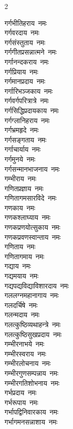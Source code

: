 \begin{multicols}{2}
\begin{flushleft}
गर्गभीतिहराय~नमः\hfill{}\\
गर्गवरदाय~नमः\\
गर्गसंस्तुताय~नमः\\
गर्गगीतप्रसन्नात्मने~नमः\\
गर्गानन्दकराय~नमः\\
गर्गप्रियाय~नमः\\
गर्गमानप्रदाय~नमः\\
गर्गारिभञ्जकाय~नमः\\
गर्गवर्गपरित्रात्रे~नमः\\
गर्गसिद्धिप्रदायकाय~नमः\\
गर्गग्लानिहराय~नमः\hfill{}\\
गर्गभ्रमहृदे~नमः\\
गर्गसङ्गताय~नमः\\
गर्गाचार्याय~नमः\\
गर्गमुनये~नमः\\
गर्गसन्मानभाजनाय~नमः\\
गम्भीराय~नमः\\
गणितप्रज्ञाय~नमः\\
गणितागमसारविदे~नमः\\
गणकाय~नमः\\
गणकश्लाघ्याय~नमः\hfill{}\\
गणकप्रणयोत्सुकाय~नमः\\
गणकप्रवणस्वान्ताय~नमः\\
गणिताय~नमः\\
गणितागमाय~नमः\\
गद्याय~नमः\\
गद्यमयाय~नमः\\
गद्यपद्यविद्याविशारदाय~नमः\\
गललग्नमहानागाय~नमः\\
गलदर्चिषे~नमः\\
गलन्मदाय~नमः\hfill{}\\
गलत्कुष्ठिव्यथाहन्त्रे~नमः\\
गलत्कुष्ठिसुखप्रदाय~नमः\\
गम्भीरनाभये~नमः\\
गम्भीरस्वराय~नमः\\
गम्भीरलोचनाय~नमः\\
गम्भीरगुणसम्पन्नाय~नमः\\
गम्भीरगतिशोभनाय~नमः\\
गर्भप्रदाय~नमः\\
गर्भरूपाय~नमः\\
गर्भापद्विनिवारकाय~नमः\hfill{}\\
गर्भागमनसन्नाशाय~नमः\\

\end{flushleft}
\end{multicols}
